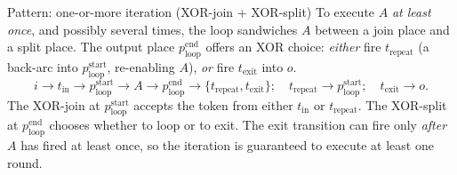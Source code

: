 \begin{examplebox}{Pattern: one-or-more iteration (XOR-join + XOR-split)}
To execute $A$ \emph{at least once}, and possibly several times, the loop sandwiches $A$ between a join place and a split place. The output place $p_{\mathrm{loop}}^{\mathrm{end}}$ offers an XOR choice: \emph{either} fire $t_{\mathrm{repeat}}$ (a back-arc into $p_{\mathrm{loop}}^{\mathrm{start}}$, re-enabling $A$), \emph{or} fire $t_{\mathrm{exit}}$ into $o$.
\[
  i \to t_{\mathrm{in}} \to p_{\mathrm{loop}}^{\mathrm{start}} \to A \to p_{\mathrm{loop}}^{\mathrm{end}} \to \{t_{\mathrm{repeat}}, t_{\mathrm{exit}}\}; \quad t_{\mathrm{repeat}} \to p_{\mathrm{loop}}^{\mathrm{start}}; \quad t_{\mathrm{exit}} \to o.
\]
The XOR-join at $p_{\mathrm{loop}}^{\mathrm{start}}$ accepts the token from either $t_{\mathrm{in}}$ or $t_{\mathrm{repeat}}$. The XOR-split at $p_{\mathrm{loop}}^{\mathrm{end}}$ chooses whether to loop or to exit. The exit transition can fire only \emph{after} $A$ has fired at least once, so the iteration is guaranteed to execute at least one round.


\end{examplebox}
